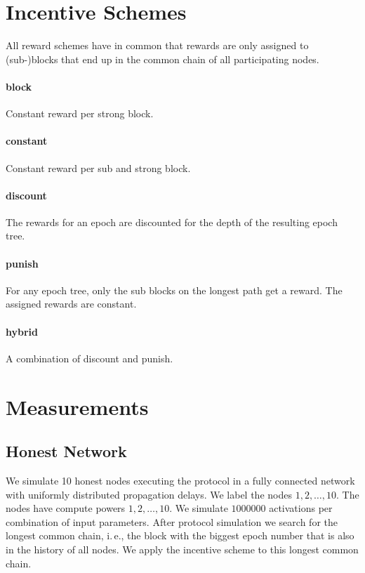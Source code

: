 \documentclass{article}
\begin{document}
\section{Incentive Schemes}

All reward schemes have in common that rewards are only assigned to (sub-)blocks that end up in the common chain of all participating nodes.

\paragraph{block}
Constant reward per strong block.

\paragraph{constant}
Constant reward per sub and strong block.

\paragraph{discount}
The rewards for an epoch are discounted for the depth of the resulting epoch tree.

\paragraph{punish}
For any epoch tree, only the sub blocks on the longest path get a reward. The assigned rewards are constant.

\paragraph{hybrid}
A combination of discount and punish.

\section{Measurements}

\subsection{Honest Network}

We simulate 10 honest nodes executing the protocol in a fully connected network with uniformly distributed propagation delays.
We label the nodes $1, 2, \dots, 10$. The nodes have compute powers $1, 2, \dots, 10$.
We simulate $1 000 000$ activations per combination of input parameters.
After protocol simulation we search for the longest common chain, i.\,e., the block with the biggest epoch number that is also in the history of all nodes.
We apply the incentive scheme to this longest common chain.
\end{document}
